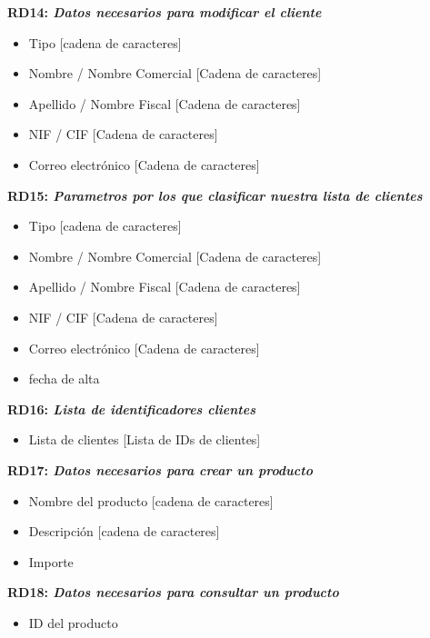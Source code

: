 \documentclass[paper=a4, fontsize=11pt, spanish]{scrartcl}
\begin{document}
\setlength{\parindent}{0em}
\textbf{RD14: \textit{Datos necesarios para modificar el cliente}}
\setlength{\parindent}{2em}
\begin{itemize}
\item Tipo [cadena de caracteres]
\item Nombre / Nombre Comercial [Cadena de caracteres]
\item Apellido / Nombre Fiscal [Cadena de caracteres]
\item NIF / CIF [Cadena de caracteres]
\item Correo electrónico [Cadena de caracteres]
\end{itemize}

\setlength{\parindent}{0em}
\textbf{RD15: \textit{Parametros por los que clasificar nuestra lista de clientes}}
\setlength{\parindent}{2em}
\begin{itemize}
\item Tipo [cadena de caracteres]
\item Nombre / Nombre Comercial [Cadena de caracteres]
\item Apellido / Nombre Fiscal [Cadena de caracteres]
\item NIF / CIF [Cadena de caracteres]
\item Correo electrónico [Cadena de caracteres]
\item fecha de alta
\end{itemize}

\setlength{\parindent}{0em}
\textbf{RD16: \textit{Lista de identificadores clientes}}
\setlength{\parindent}{2em}
\begin{itemize}
\item Lista de clientes [Lista de IDs de clientes]
\end{itemize}

\setlength{\parindent}{0em}
	\textbf{RD17: \textit{Datos necesarios para crear un producto}}
	\setlength{\parindent}{2em}
	\begin{itemize}
		\item Nombre del producto [cadena de caracteres]
		\item Descripción [cadena de caracteres]
		\item Importe
	\end{itemize}

	\setlength{\parindent}{0em}
	\textbf{RD18: \textit{Datos necesarios para consultar un producto}}
	\setlength{\parindent}{2em}
	\begin{itemize}
		\item ID del producto
	\end{itemize}
\end{document}
